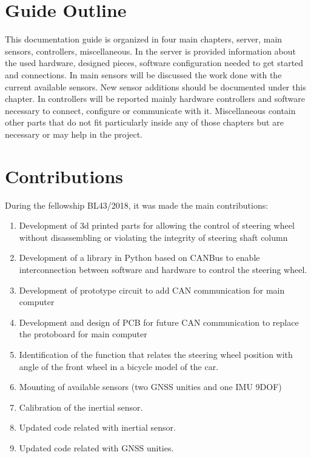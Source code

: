 \section{Guide Outline}
\label{section:outline} 

This documentation guide is organized in four main chapters, server, main sensors, controllers, miscellaneous.
In the server is provided information about the used hardware, designed pieces, software configuration needed to get started and connections.
In main sensors will be discussed the work done with the current available sensors. New sensor additions should be documented under this chapter.
In controllers will be reported mainly hardware controllers and software necessary to connect, configure  or communicate with it.
Miscellaneous contain other parts that do not fit particularly inside any of those chapters but are necessary or may help in the project.

 

\section{Contributions}
\label{section:contributions}

During the fellowship BL43/2018, it was made the main contributions:
\begin{enumerate}
	\item Development of 3d printed parts for allowing the control of steering wheel without disassembling or violating the integrity of steering shaft column
	\item Development of a library in Python based on CANBus to enable interconnection between software and hardware to control the steering wheel.
	\item Development of prototype circuit to add CAN communication for main computer
	\item Development and design of \acrshort{PCB} for future CAN communication to replace the protoboard for main computer
	\item Identification of the function that relates the steering wheel position with angle of the front wheel in a bicycle model of the car.
	\item Mounting of available sensors (two  \acrshort{GNSS} unities and one \acrshort{IMU} \acrshort{9DOF})
	\item Calibration of the inertial sensor.
	\item Updated code related with inertial sensor.
	\item Updated code related with \acrshort{GNSS} unities.
\end{enumerate}

